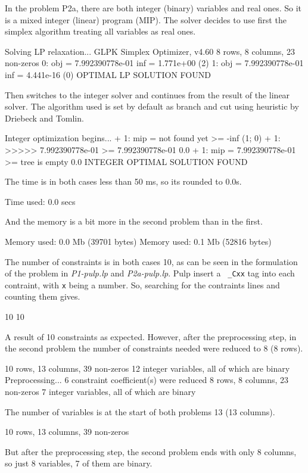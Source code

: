 \documentclass[11pt,a4paper]{article}
\begin{document}
In the problem P2a, there are both integer (binary) variables and real ones. So 
it is a mixed integer (linear) program (MIP). The solver decides to use first 
the simplex algorithm treating all variables as real ones.
%
\begin{textcode}
Solving LP relaxation...
GLPK Simplex Optimizer, v4.60
8 rows, 8 columns, 23 non-zeros
      0: obj =   7.992390778e-01 inf =   1.771e+00 (2)
      1: obj =   7.992390778e-01 inf =   4.441e-16 (0)
OPTIMAL LP SOLUTION FOUND
\end{textcode}
%
Then switches to the integer solver and continues from the result of the linear 
solver. The algorithm used is set by default as branch and cut using heuristic 
by Driebeck and Tomlin.
%
\begin{textcode}
Integer optimization begins...
+     1: mip =     not found yet >=              -inf        (1; 0)
+     1: >>>>>   7.992390778e-01 >=   7.992390778e-01   0.0%
+     1: mip =   7.992390778e-01 >=     tree is empty   0.0%
INTEGER OPTIMAL SOLUTION FOUND
\end{textcode}
%
The time is in both cases less than 50 ms, so its rounded to 0.0s.
\begin{textcode}
Time used:   0.0 secs
\end{textcode}
And the memory is a bit more in the second problem than in the first.
\begin{textcode}
Memory used: 0.0 Mb (39701 bytes)
Memory used: 0.1 Mb (52816 bytes)
\end{textcode}
The number of constraints is in both cases 10, as can be seen in the formulation 
of the problem in {\sl P1-pulp.lp} and {\sl P2a-pulp.lp}. Pulp insert a {\tt 
\_Cxx} tag into each contraint, with {\tt x} being a number. So, searching for 
the contraints lines and counting them gives.
\begin{textcode}
10
10
\end{textcode}
A result of 10 constraints as expected. However, after the preprocessing step, 
in the second problem the number of constraints needed were reduced to 8 (8 
rows).
%
\begin{textcode}
10 rows, 13 columns, 39 non-zeros
12 integer variables, all of which are binary
Preprocessing...
6 constraint coefficient(s) were reduced
8 rows, 8 columns, 23 non-zeros
7 integer variables, all of which are binary
\end{textcode}
%
The number of variables is at the start of both problems 13 (13 columns).
\begin{textcode}
10 rows, 13 columns, 39 non-zeros
\end{textcode}
But after the preprocessing step, the second problem ends with only 8 columns, 
so just 8 variables, 7 of them are binary.
\end{document}
